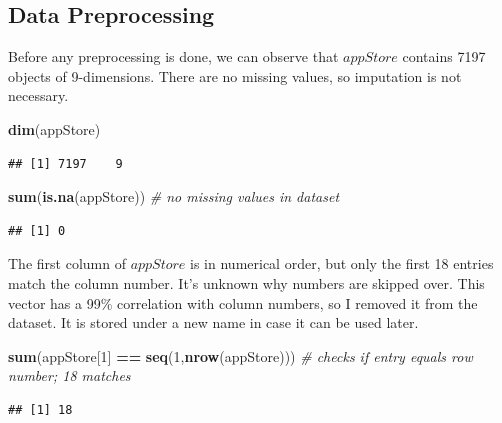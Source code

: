 \documentclass[]{article}
\newenvironment{Shaded}{\begin{snugshade}}{\end{snugshade}}
\newcommand{\CommentTok}[1]{\textcolor[rgb]{0.56,0.35,0.01}{\textit{#1}}}
\newcommand{\DecValTok}[1]{\textcolor[rgb]{0.00,0.00,0.81}{#1}}
\newcommand{\KeywordTok}[1]{\textcolor[rgb]{0.13,0.29,0.53}{\textbf{#1}}}
\newcommand{\NormalTok}[1]{#1}
\newcommand{\OperatorTok}[1]{\textcolor[rgb]{0.81,0.36,0.00}{\textbf{#1}}}
\newcommand{\StringTok}[1]{\textcolor[rgb]{0.31,0.60,0.02}{#1}}
\begin{document}
\hypertarget{data-preprocessing}{%
\subsection{Data Preprocessing}\label{data-preprocessing}}

Before any preprocessing is done, we can observe that
\(\textit{appStore}\) contains 7197 objects of 9-dimensions. There are
no missing values, so imputation is not necessary.

\begin{Shaded}
\begin{Highlighting}[]
\KeywordTok{dim}\NormalTok{(appStore)}
\end{Highlighting}
\end{Shaded}

\begin{verbatim}
## [1] 7197    9
\end{verbatim}

\begin{Shaded}
\begin{Highlighting}[]
\KeywordTok{sum}\NormalTok{(}\KeywordTok{is.na}\NormalTok{(appStore)) }\CommentTok{# no missing values in dataset}
\end{Highlighting}
\end{Shaded}

\begin{verbatim}
## [1] 0
\end{verbatim}

The first column of \(\textit{appStore}\) is in numerical order, but
only the first 18 entries match the column number. It's unknown why
numbers are skipped over. This vector has a 99\% correlation with column
numbers, so I removed it from the dataset. It is stored under a new name
in case it can be used later.

\begin{Shaded}
\begin{Highlighting}[]
\KeywordTok{sum}\NormalTok{(appStore[}\DecValTok{1}\NormalTok{] }\OperatorTok{==}\StringTok{ }\KeywordTok{seq}\NormalTok{(}\DecValTok{1}\NormalTok{,}\KeywordTok{nrow}\NormalTok{(appStore))) }\CommentTok{# checks if entry equals row number; 18 matches}
\end{Highlighting}
\end{Shaded}

\begin{verbatim}
## [1] 18
\end{verbatim}

\begin{Shaded}
\end{Shaded}
\end{document}
